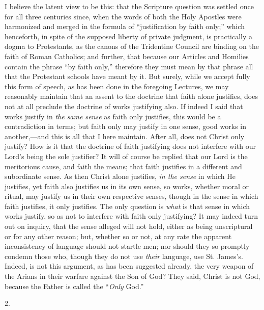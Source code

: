 I believe the latent view to be this: that the Scripture question
was settled once for all three centuries since, when the words of both
the Holy Apostles were harmonized and merged in the formula of
``justification by faith only;'' which henceforth, in spite of
the supposed liberty of private judgment, is practically a dogma to
Protestants, as the canons of the Tridentine Council are binding on
the faith of Roman Catholics; and further, that because our Articles
and Homilies contain the phrase ``by faith only,'' therefore
they must mean by that phrase all that the Protestant schools have
meant by it. But surely, while we accept fully this form of speech, as
has been done in the foregoing Lectures, we may reasonably
maintain that an assent to the doctrine that faith alone justifies,
does not at all preclude the doctrine of works justifying also. If
indeed I said that works justify in \emph{the same sense} as faith
only justifies, this would be a contradiction in terms; but faith only
may justify in one sense, good works in another,—and this is all
that I here maintain. After all, does not Christ only justify? How is
it that the doctrine of faith justifying does not interfere with our
Lord's being the sole justifier? It will of course be replied that our
Lord is the meritorious cause, and faith the means; that faith
justifies in a different and subordinate sense. As then Christ alone
justifies, \emph{in the sense} in which He justifies, yet faith also
justifies us in its own sense, so works, whether moral or ritual, may
justify us in their own respective senses, though in the sense in
which faith justifies, it only justifies. The only question is \emph{what}
is that sense in which works justify, so as not to interfere with
faith only justifying? It may indeed turn out on inquiry, that the
sense alleged will not hold, either as being unscriptural or for any
other reason; but, whether so or not, at any rate the apparent
inconsistency of language should not startle men; nor should they so
promptly condemn those who, though they do not use \emph{their}
language, use St. James's. Indeed, is not this argument, as has been
suggested already, the very weapon of the Arians in their warfare
against the Son of God? They said, Christ is not God, because the
Father is called the ``\emph{Only} God.''

2.

